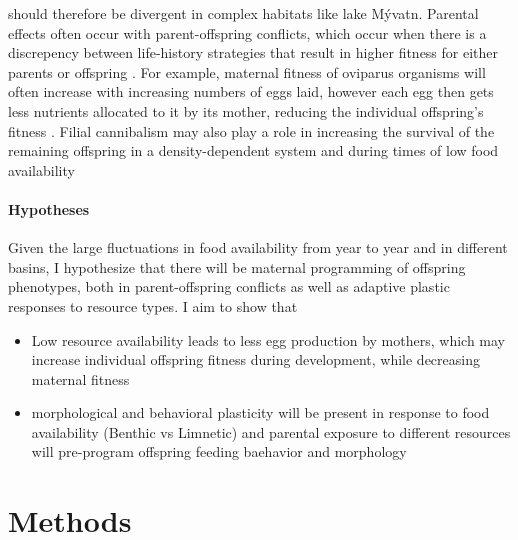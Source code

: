 \documentclass[12pt]{extarticle}
\begin{document}
should therefore be divergent in complex habitats like lake M\'yvatn. Parental effects often occur with parent-offspring conflicts, which occur when there is a discrepency between life-history strategies that result in higher fitness for either parents or offspring \citep{Uller2008}. For example, maternal fitness of oviparus organisms will often increase with increasing numbers of eggs laid, however each egg then gets less nutrients allocated to it by its mother, reducing the individual offspring's fitness \citep{Uller2008, Rasanen2007}. Filial cannibalism may also play a role in increasing the survival of the remaining offspring in a density-dependent system and during times of low food availability \citep{Bartrons2018} \\

\paragraph{Hypotheses}
Given the large fluctuations in food availability from year to year and in different basins, I hypothesize that there will be maternal programming of offspring phenotypes, both in parent-offspring conflicts as well as adaptive plastic responses to resource types. I aim to show that 
\begin{itemize}
 \item Low resource availability leads to less egg production by mothers, which may increase individual offspring fitness during development, while decreasing maternal fitness
 \item morphological and behavioral plasticity will be present in response to food availability (Benthic vs Limnetic) and parental exposure to different resources will pre-program offspring feeding baehavior and morphology
\end{itemize}





\section*{Methods}
\end{document}
